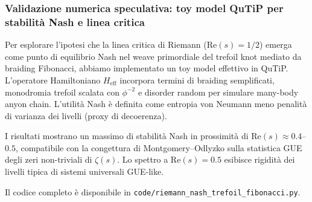 \documentclass[11pt,a4paper]{article}
\theoremstyle{plain}
\theoremstyle{definition}
\begin{document}
\subsubsection{Validazione numerica speculativa: toy model QuTiP per stabilità Nash e linea critica}

Per esplorare l'ipotesi che la linea critica di Riemann ($\mathrm{Re}(s)=1/2$) emerga come punto di equilibrio Nash nel weave primordiale del trefoil knot mediato da braiding Fibonacci, abbiamo implementato un toy model effettivo in QuTiP. L'operatore Hamiltoniano $H_{\mathrm{eff}}$ incorpora termini di braiding semplificati, monodromia trefoil scalata con $\phi^{-2}$ e disorder random per simulare many-body anyon chain. L'utilità Nash è definita come entropia von Neumann meno penalità di varianza dei livelli (proxy di decoerenza).

\vspace{0.3cm}

I risultati mostrano un massimo di stabilità Nash in prossimità di $\mathrm{Re}(s) \approx 0.4$--$0.5$, compatibile con la congettura di Montgomery–Odlyzko sulla statistica GUE degli zeri non-triviali di $\zeta(s)$. Lo spettro a $\mathrm{Re}(s)=0.5$ esibisce rigidità dei livelli tipica di sistemi universali GUE-like.


\vspace{0.5cm}

Il codice completo è disponibile in \texttt{code/riemann\_nash\_trefoil\_fibonacci.py}.
\end{document}
